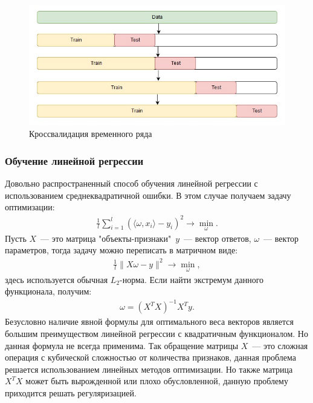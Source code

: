 \documentclass[12pt,a4paper]{article} %
\begin{document}
\begin{figure}[h]
	
	\centering
	
	\includegraphics[width=0.7\linewidth]{tcross_val.jpg}
	
	\caption{Кроссвалидация временного ряда}
	
	\label{fig:tcross_val}
	
\end{figure}

\subsubsection{Обучение линейной регрессии}

Довольно распространенный способ обучения линейной регрессии с использованием среднеквадратичной ошибки. В этом случае получаем задачу оптимизации:
 \begin{gather}\label{linreglearn1}
	\frac{1}{l}\sum\limits_{i=1}^{l}(\langle\omega, x_i\rangle - y_i)^2 \rightarrow \min_{\omega}.
\end{gather}
Пусть $X$~--- это матрица "объекты-признаки"\, $y$~--- вектор ответов, $\omega$~--- вектор параметров, тогда задачу можно переписать в матричном виде:
 \begin{gather}\label{linreglearn2}
	\frac{1}{l}\|X\omega - y\|^2 \rightarrow \min_{\omega},
\end{gather}
здесь используется обычная $L_2$-норма. Если найти экстремум данного функционала, получим:
 \begin{gather}\label{linreglearn3}
	\omega = (X^TX)^{-1}X^Ty.
\end{gather}
Безусловно наличие явной формулы для оптимального веса векторов является большим преимуществом линейной регрессии с квадратичным функционалом. Но данная формула не всегда применима. Так обращение матрицы $X$~--- это сложная операция с кубической сложностью от количества признаков, данная проблема решается использованием линейных методов оптимизации. Но также матрица $X^TX$ может быть вырожденной или плохо обусловленной, данную проблему приходится решать регуляризацией.
\end{document}
